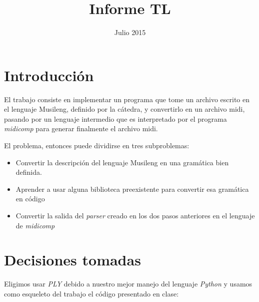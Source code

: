 \documentclass{article}
\title{Informe TL}
\date{Julio 2015}
\begin{document}
\newcommand{\num}{\textit{\textbf{num}}}
\newcommand{\var}{\textit{\textbf{constante}}}



%



\begin{titlepage}
\maketitle
\thispagestyle{empty}
\end{titlepage} 


\section*{Introducción}
El trabajo consiste en implementar un programa que tome un archivo escrito en el lenguaje Musileng,
definido por la cátedra, y convertirlo en un archivo midi, pasando por un lenguaje intermedio que es
interpretado por el programa \emph{midicomp} para generar finalmente el archivo midi.

El problema, entonces puede dividirse en tres subproblemas: 

\begin{itemize}
	\item Convertir la descripción del lenguaje Musileng en una gramática bien definida.
	\item Aprender a usar alguna biblioteca preexistente para convertir esa gramática en código
	\item Convertir la salida del \emph{parser} creado en los dos pasos anteriores en el lenguaje de
		\emph{midicomp}
\end{itemize}

\section*{Decisiones tomadas}
Eligimos usar \emph{PLY} debido a nuestro mejor manejo del lenguaje \emph{Python} y usamos como
esqueleto del trabajo el código presentado en clase:
\end{document}
